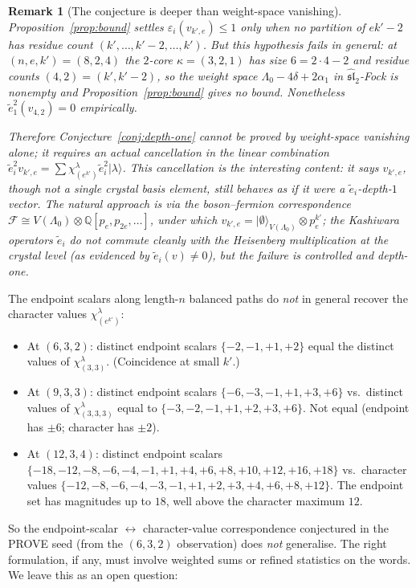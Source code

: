 \documentclass[11pt]{article}
\newtheorem{remark}[theorem]{Remark}
\theoremstyle{definition}
\newcommand{\Fock}{\mathcal{F}}
\newcommand{\te}{\tilde e}
\newcommand{\eps}{\varepsilon}
\begin{document}
\begin{remark}[The conjecture is deeper than weight-space vanishing]\label{rem:cancel}
Proposition~\ref{prop:bound} settles $\eps_i(v_{k',e}) \le 1$ only when no partition of
$ek'-2$ has residue count $(k', \ldots, k'-2, \ldots, k')$. But this hypothesis
\emph{fails} in general: at $(n,e,k')=(8,2,4)$ the $2$-core $\kappa = (3,2,1)$ has size
$6 = 2\cdot 4 - 2$ and residue counts $(4,2) = (k', k'-2)$, so the weight space
$\Lambda_0 - 4\delta + 2\alpha_1$ in $\hat{\mathfrak{sl}}_2$-Fock is nonempty and
Proposition~\ref{prop:bound} gives no bound. Nonetheless
$\te_1^2(v_{4,2}) = 0$ empirically.

Therefore Conjecture~\ref{conj:depth-one} cannot be proved by weight-space vanishing
alone; it requires an actual \emph{cancellation} in the linear combination
$\te_i^2 v_{k',e} = \sum \chi^\lambda_{(e^{k'})} \te_i^2|\lambda\rangle$. This
cancellation is the interesting content: it says $v_{k',e}$, though not a single crystal
basis element, still behaves as if it were a $\te_i$-depth-$1$ vector. The natural
approach is via the boson--fermion correspondence
$\Fock \cong V(\Lambda_0)\otimes \mathbb{Q}[p_e,p_{2e},\ldots]$, under which
$v_{k',e} = |\emptyset\rangle_{V(\Lambda_0)}\otimes p_e^{k'}$; the Kashiwara operators
$\te_i$ do \emph{not} commute cleanly with the Heisenberg multiplication at the crystal
level (as evidenced by $\te_i(v)\ne 0$), but the failure is controlled and depth-one.
\end{remark}

The endpoint scalars along length-$n$ balanced paths do \emph{not} in general recover
the character values $\chi^\lambda_{(e^{k'})}$:
\begin{itemize}
  \item At $(6,3,2)$: distinct endpoint scalars $\{-2,-1,+1,+2\}$ equal the distinct
  values of $\chi^\lambda_{(3,3)}$. (Coincidence at small $k'$.)
  \item At $(9,3,3)$: distinct endpoint scalars $\{-6,-3,-1,+1,+3,+6\}$ vs.\
  distinct values of $\chi^\lambda_{(3,3,3)}$ equal to $\{-3,-2,-1,+1,+2,+3,+6\}$.
  Not equal (endpoint has $\pm 6$; character has $\pm 2$).
  \item At $(12,3,4)$: distinct endpoint scalars $\{-18,-12,-8,-6,-4,-1,+1,+4,+6,+8,+10,
  +12,+16,+18\}$ vs.\ character values $\{-12,-8,-6,-4,-3,-1,+1,+2,+3,+4,+6,+8,+12\}$.
  The endpoint set has magnitudes up to $18$, well above the character maximum $12$.
\end{itemize}
So the endpoint-scalar $\leftrightarrow$ character-value correspondence conjectured in the
PROVE seed (from the $(6,3,2)$ observation) does \emph{not} generalise. The right
formulation, if any, must involve weighted sums or refined statistics on the words. We
leave this as an open question:
\end{document}
